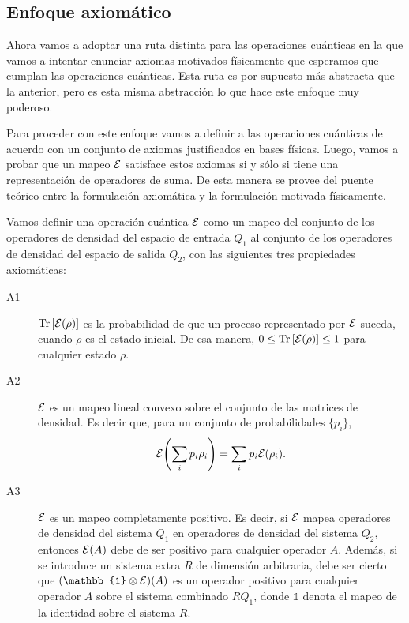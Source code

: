 \subsection{Enfoque axiomático}
Ahora vamos a adoptar una ruta distinta para las operaciones cuánticas
en la que vamos a intentar enunciar axiomas motivados físicamente que
esperamos que cumplan las operaciones cuánticas. Esta ruta es por supuesto
más abstracta que la anterior, pero es esta misma abstracción lo que hace
este enfoque muy poderoso.

Para proceder con este enfoque vamos a definir a las operaciones 
cuánticas de acuerdo con un conjunto de axiomas justificados en
bases físicas. Luego, vamos a probar que un mapeo $\mathcal{E}$ satisface
estos axiomas si y sólo si tiene una representación de operadores
de suma. De esta manera se provee del puente teórico entre 
la formulación axiomática y la formulación motivada físicamente.

Vamos definir una operación cuántica $\mathcal{E}$ como un mapeo del conjunto
de los operadores de densidad del espacio de entrada $Q_1$ al 
conjunto de los operadores de densidad del espacio de salida $Q_2$,
con las siguientes tres propiedades axiomáticas:
\begin{description}
	\item[A1] \label{axiom1}
	$\Tr \qty[\mathcal{E} (\rho)]$ es la probabilidad de que un proceso
	representado por $\mathcal{E}$ suceda, cuando $\rho$ es el estado inicial. 
	De esa manera, $0\leq \Tr \qty[\mathcal{E} (\rho)]\leq 1$ para cualquier
	estado $\rho$.
	\item[A2] $\mathcal{E}$ es un mapeo lineal convexo sobre el conjunto de las 
	matrices de densidad. Es decir que, para un conjunto
	de probabilidades $\{ p_i\}$,
	\begin{align}
		\mathcal{E} \qty(\sum _i p_i\rho_i) = \sum _i p_i \mathcal{E} \qty(\rho_i).
		\label{eq:qtmOp-a2}
	\end{align}
	\item[A3] $\mathcal{E}$ es un mapeo completamente positivo. Es decir, si $\mathcal{E}$ 
	mapea operadores de densidad del sistema $Q_1$ en operadores de
	densidad del sistema $Q_2$, entonces $\mathcal{E} (A)$ debe de ser positivo
	para cualquier operador $A$. Además, si se introduce un sistema
	extra $R$ de dimensión arbitraria, debe ser cierto que $\qty(
	\mathbb{1}\otimes \E)(A)$ es un operador positivo para cualquier
	operador $A$ sobre el sistema combinado $RQ_1$, donde $\mathbb{1}$
	denota el mapeo de la identidad sobre el sistema $R$.
\end{description}

